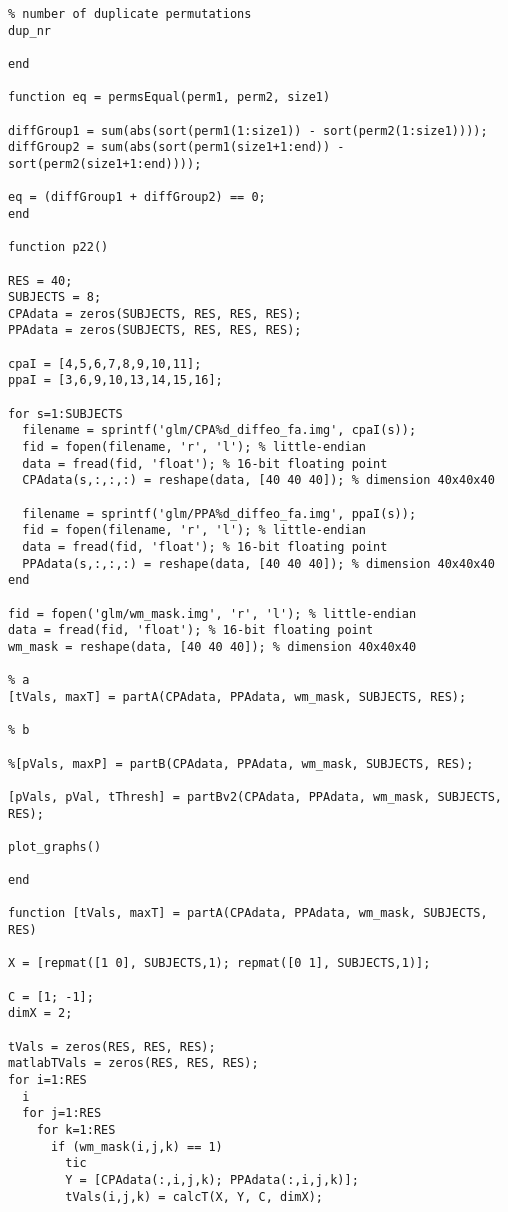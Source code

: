 \documentclass[11pt,a4paper,oneside]{report}
\begin{document}
\begin{lstlisting}
% number of duplicate permutations
dup_nr

end

function eq = permsEqual(perm1, perm2, size1)

diffGroup1 = sum(abs(sort(perm1(1:size1)) - sort(perm2(1:size1))));
diffGroup2 = sum(abs(sort(perm1(size1+1:end)) - sort(perm2(size1+1:end))));

eq = (diffGroup1 + diffGroup2) == 0;
end

function p22()

RES = 40;
SUBJECTS = 8;
CPAdata = zeros(SUBJECTS, RES, RES, RES);
PPAdata = zeros(SUBJECTS, RES, RES, RES);

cpaI = [4,5,6,7,8,9,10,11];
ppaI = [3,6,9,10,13,14,15,16];

for s=1:SUBJECTS
  filename = sprintf('glm/CPA%d_diffeo_fa.img', cpaI(s));
  fid = fopen(filename, 'r', 'l'); % little-endian
  data = fread(fid, 'float'); % 16-bit floating point
  CPAdata(s,:,:,:) = reshape(data, [40 40 40]); % dimension 40x40x40
  
  filename = sprintf('glm/PPA%d_diffeo_fa.img', ppaI(s));
  fid = fopen(filename, 'r', 'l'); % little-endian
  data = fread(fid, 'float'); % 16-bit floating point
  PPAdata(s,:,:,:) = reshape(data, [40 40 40]); % dimension 40x40x40
end

fid = fopen('glm/wm_mask.img', 'r', 'l'); % little-endian
data = fread(fid, 'float'); % 16-bit floating point
wm_mask = reshape(data, [40 40 40]); % dimension 40x40x40

% a
[tVals, maxT] = partA(CPAdata, PPAdata, wm_mask, SUBJECTS, RES);

% b

%[pVals, maxP] = partB(CPAdata, PPAdata, wm_mask, SUBJECTS, RES);

[pVals, pVal, tThresh] = partBv2(CPAdata, PPAdata, wm_mask, SUBJECTS, RES);

plot_graphs()

end

function [tVals, maxT] = partA(CPAdata, PPAdata, wm_mask, SUBJECTS, RES)

X = [repmat([1 0], SUBJECTS,1); repmat([0 1], SUBJECTS,1)];

C = [1; -1];
dimX = 2;

tVals = zeros(RES, RES, RES);
matlabTVals = zeros(RES, RES, RES);
for i=1:RES
  i
  for j=1:RES
    for k=1:RES
      if (wm_mask(i,j,k) == 1)
        tic
        Y = [CPAdata(:,i,j,k); PPAdata(:,i,j,k)];
        tVals(i,j,k) = calcT(X, Y, C, dimX);


\end{lstlisting}
\end{document}
